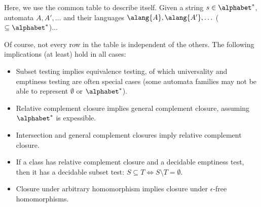 Here, we use the common table to describe itself.  Given a string $s \in
\alphabet^*$, automata $A, A', \ldots$ and their languages $\alang{A},
\alang{A'}, \ldots$ ($\subseteq \alphabet^*$)...

Of course, not every row in the table is independent of the others.  The
following implications (at least) hold in all cases:
\begin{itemize}
	\item Subset testing implies equivalence testing, of which universality
          and emptiness testing are often special cases (some automata
          families may not be able to represent $\emptyset$ or
          $\alphabet^*$).
	\item Relative complement closure implies general complement closure, assuming $\alphabet^*$ is expessible.
	\item Intersection and general complement closures imply
          relative complement closure.
    \item If a class has relative complement closure and a decidable emptiness test,
          then it has a decidable subset test:
          $S \subseteq T \Leftrightarrow S \setminus T = \emptyset$.
	\item Closure under arbitrary homomorphism implies closure under
          $\epsilon$-free homomorphisms.
\end{itemize}
